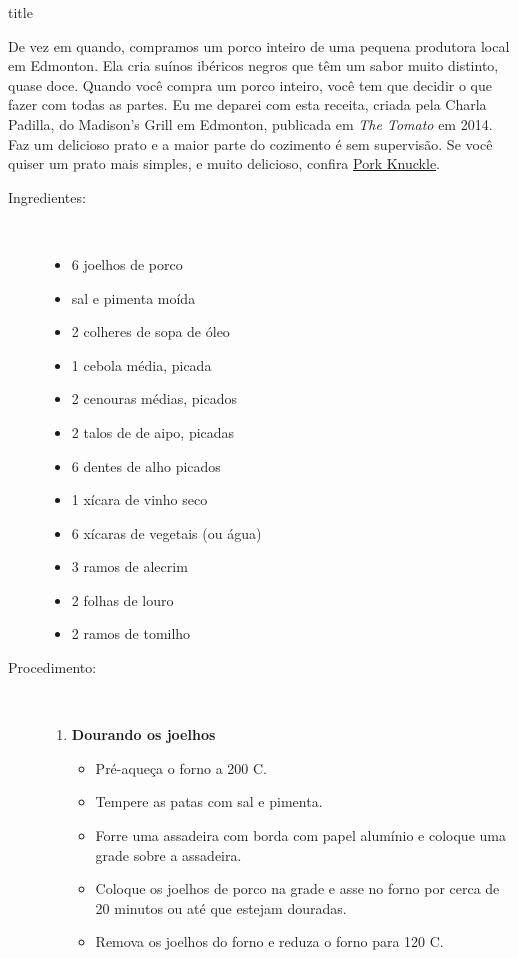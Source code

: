 \documentclass [11pt, letterpaper] {article}
\begin{document}
 {title}

De vez em quando, compramos um porco inteiro de uma pequena produtora local em Edmonton. Ela cria suínos ibéricos negros que têm um sabor muito distinto, quase doce. Quando você compra um porco inteiro, você tem que decidir o que fazer com todas as partes. Eu me deparei com esta receita, criada pela Charla Padilla, do Madison's Grill em Edmonton, publicada em {\it The Tomato} em 2014. Faz um delicioso prato e a maior parte do cozimento é sem supervisão. Se você quiser um prato mais simples, e muito delicioso, confira \href {PorkKnuckle.html} {Pork Knuckle}.


\begin {description}

\item [Ingredientes:] \ \\
\begin {itemize}
\item 6 joelhos de porco
\item sal e pimenta moída
\item 2 colheres de sopa de \'oleo
\item 1 cebola média, picada
\item 2 cenouras médias, picados
\item 2 talos de de aipo, picadas
\item 6 dentes de alho picados
\item 1 xícara de vinho seco
\item 6 xícaras de vegetais (ou água)
\item 3 ramos de alecrim
\item 2 folhas de louro
\item 2 ramos de tomilho
\end {itemize}


\item [Procedimento:] \ \\

\begin {enumerate}
\item {\bf Dourando os joelhos}
\begin {itemize}
\item Pré-aqueça o forno a 200 C.
\item Tempere as patas com sal e pimenta.
\item Forre uma assadeira com borda com papel alumínio e coloque uma grade sobre a assadeira.
\item Coloque os joelhos de porco na grade e asse no forno por cerca de 20 minutos ou até que estejam douradas.
\item Remova os joelhos do forno e reduza o forno para 120 C.
\end {itemize}


\end{enumerate}
\end{description}
\end{document}
